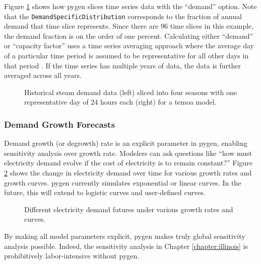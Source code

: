 Figure \ref{fig:steam-timeslice} shows how \gls{pygen} slices time series
data with the ``demand'' option. Note that the \texttt{DemandSpecificDistribution}
corresponds to the fraction of annual demand that time slice represents. Since
there are 96 time slices in this example, the demand fraction is on the order of one
percent. Calculating either ``demand'' or ``capacity factor'' uses a time series
averaging approach where the average day of a particular time period is assumed
to be representative for all other days in that period \cite{kotzur_impact_2018}.
If the time series has multiple years of data, the data is further averaged
across all years.

\begin{figure}[H]
  \resizebox{\textwidth}{!}{}
  \caption{Historical steam demand data (left) sliced into four seasons with one
  representative day of 24 hours each (right) for a \gls{temoa} model.}
  \label{fig:steam-timeslice}
\end{figure}

\subsubsection{Demand Growth Forecasts}
Demand growth (or degrowth) rate is an explicit parameter in \gls{pygen}, enabling
sensitivity analysis over growth rate. Modelers can ask questions like
``how must electricity demand evolve if the cost of electricity is to remain
constant?'' Figure \ref{fig:dem-growth} shows the change in electricity demand
over time for various growth rates and growth curves. \gls{pygen} currently simulates
exponential or linear curves. In the future, this will extend to logistic curves
and user-defined curves.

\begin{figure}[H]
  \centering
  \resizebox{0.8\textwidth}{!}{}
  \caption{Different electricity demand futures under various growth rates and curves.}
  \label{fig:dem-growth}
\end{figure}

By making all model parameters explicit, \gls{pygen} makes truly global sensitivity
analysis possible. Indeed, the sensitivity analysis in Chapter \ref{chapter:illinois}
is prohibitively labor-intensive without \gls{pygen}.

